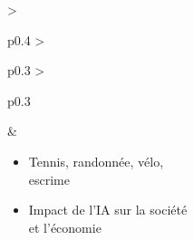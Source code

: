 \begin{tabularx}{\textwidth}{>{\raggedright\arraybackslash}p{0.4\textwidth} >{\raggedright\arraybackslash}p{0.3\textwidth} >{\raggedright\arraybackslash}p{0.3\textwidth}}
  &
  \begin{minipage}[t]{\linewidth}\scriptsize\raggedright
    \begin{itemize}[leftmargin=*,itemsep=1pt,parsep=0pt,topsep=0pt,partopsep=0pt]
      \item Tennis, randonnée, vélo, \\escrime
      \item Impact de l'IA sur la société \\et l'économie
    \end{itemize}
  \end{minipage}
\\
\end{tabularx}




